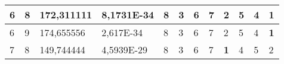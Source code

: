 \documentclass[conference]{IEEEtran}
\begin{document}
\begin{table*}[]
\begin{tabular}{|llll|llllllll|}
\multicolumn{1}{|l|}{6}                                                     & \multicolumn{1}{l|}{8}                                                        & \multicolumn{1}{l|}{172,311111}                                                   & 8,1731E-34                     & \multicolumn{1}{l|}{8}                                                  & \multicolumn{1}{l|}{3}                                                  & \multicolumn{1}{l|}{6}                                                  & \multicolumn{1}{l|}{7}                                                  & \multicolumn{1}{l|}{2}                                                  & \multicolumn{1}{l|}{5}                                                  & \multicolumn{1}{l|}{4}                                                  & \textbf{1}                 \\ \hline
\multicolumn{1}{|l|}{6}                                                     & \multicolumn{1}{l|}{9}                                                        & \multicolumn{1}{l|}{174,655556}                                                   & 2,617E-34                      & \multicolumn{1}{l|}{8}                                                  & \multicolumn{1}{l|}{3}                                                  & \multicolumn{1}{l|}{6}                                                  & \multicolumn{1}{l|}{7}                                                  & \multicolumn{1}{l|}{2}                                                  & \multicolumn{1}{l|}{5}                                                  & \multicolumn{1}{l|}{4}                                                  & \textbf{1}                 \\ \hline
\multicolumn{1}{|l|}{7}                                                     & \multicolumn{1}{l|}{8}                                                        & \multicolumn{1}{l|}{149,744444}                                                   & 4,5939E-29                     & \multicolumn{1}{l|}{8}                                                  & \multicolumn{1}{l|}{3}                                                  & \multicolumn{1}{l|}{6}                                                  & \multicolumn{1}{l|}{7}                                                  & \multicolumn{1}{l|}{\textbf{1}}                                         & \multicolumn{1}{l|}{4}                                                  & \multicolumn{1}{l|}{5}                                                  & 2                          \\ \hline

\end{tabular}
\end{table*}
\end{document}

